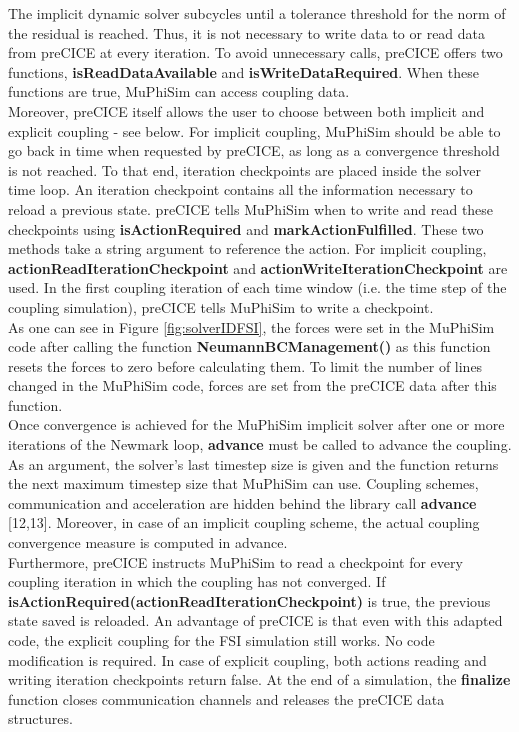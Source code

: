 \documentclass[oneside,11pt,times]{book}
\begin{document}
The implicit dynamic solver subcycles until a tolerance threshold for the norm of the residual is reached. Thus, it is not necessary to write data to or read data from preCICE at every iteration. To avoid unnecessary calls, preCICE offers two functions, \textbf{isReadDataAvailable} and \textbf{isWriteDataRequired}. When these functions are true, MuPhiSim can access coupling data.\\

Moreover, preCICE itself allows the user to choose between both implicit and explicit coupling - see below. For implicit coupling, MuPhiSim should be able to go back in time when requested by preCICE, as long as a convergence threshold is not reached. To that end, iteration checkpoints are placed inside the solver time loop. An iteration checkpoint contains all the information necessary to reload a previous state. preCICE tells MuPhiSim when to write and read these checkpoints using \textbf{isActionRequired} and \textbf{markActionFulfilled}. These two methods take a string argument to reference the action. For implicit coupling, \textbf{actionReadIterationCheckpoint} and \textbf{actionWriteIterationCheckpoint} are used. In the first coupling iteration of each time window (i.e. the time step of the coupling simulation), preCICE tells MuPhiSim to write a checkpoint.\\

As one can see in Figure \ref{fig:solverIDFSI}, the forces were set in the MuPhiSim code after calling the function \textbf{NeumannBCManagement()} as this function resets the forces to zero before calculating them. To limit the number of lines changed in the MuPhiSim code, forces are set from the preCICE data after this function.\\

Once convergence is achieved for the MuPhiSim implicit solver after one or more iterations of the Newmark loop, \textbf{advance} must be called to advance the coupling. As an argument, the solver’s last timestep size is given and the function returns the next maximum timestep size that MuPhiSim can use. Coupling schemes, communication and acceleration are hidden behind the library call \textbf{advance} [12,13]. Moreover, in case of an implicit coupling scheme, the actual coupling convergence measure is computed in {advance}.\\

Furthermore, preCICE instructs MuPhiSim to read a checkpoint for every coupling iteration in which the coupling has not converged. If \textbf{ isActionRequired(actionReadIterationCheckpoint) } is true, the previous state saved is reloaded. An advantage of preCICE is that even with this adapted code, the explicit coupling for the FSI simulation still works. No code modification is required. In case of explicit coupling, both actions reading and writing iteration checkpoints return false. At the end of a simulation, the \textbf{finalize} function closes communication channels and releases the preCICE data structures.\\
\end{document}
